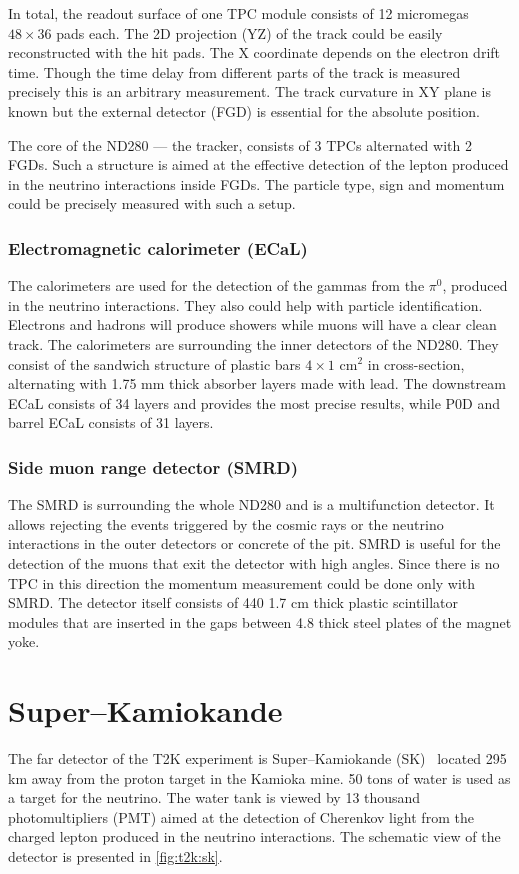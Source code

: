 \documentclass[../main.tex]{subfiles}
\begin{document}
In total, the readout surface of one TPC module consists of 12 micromegas $48\times36$ pads each. The 2D projection (YZ) of the track could be easily reconstructed with the hit pads. The X coordinate depends on the electron drift time. Though the time delay from different parts of the track is measured precisely this is an arbitrary measurement. The track curvature in XY plane is known but the external detector (FGD) is essential for the absolute position.

The core of the ND280 --- the tracker, consists of 3 TPCs alternated with 2 FGDs. Such a structure is aimed at the effective detection of the lepton produced in the neutrino interactions inside FGDs. The particle type, sign and momentum could be precisely measured with such a setup.

\subsubsection{Electromagnetic calorimeter (ECaL)}
The calorimeters are used for the detection of the gammas from the $\pi^0$, produced in the neutrino interactions. They also could help with particle identification. Electrons and hadrons will produce showers while muons will have a clear clean track. The calorimeters are surrounding the inner detectors of the ND280. They consist of the sandwich structure of plastic bars $4\times1$ $\text{cm}^2$ in cross-section, alternating with 1.75 mm thick absorber layers made with lead. The downstream ECaL consists of 34 layers and provides the most precise results, while P0D and barrel ECaL consists of 31 layers.

\subsubsection{Side muon range detector (SMRD)}
The SMRD is surrounding the whole ND280 and is a multifunction detector. It allows rejecting the events triggered by the cosmic rays or the neutrino interactions in the outer detectors or concrete of the pit. SMRD is useful for the detection of the muons that exit the detector with high angles. Since there is no TPC in this direction the momentum measurement could be done only with SMRD. The detector itself consists of 440 1.7 cm thick plastic scintillator modules that are inserted in the gaps between 4.8 thick steel plates of the magnet yoke.


\section{Super--Kamiokande}
\label{sec:T2K:sk}
The far detector of the T2K experiment is Super--Kamiokande (SK)~\cite{Fukuda2003} located 295 km away from the proton target in the Kamioka mine. 50 tons of water is used as a target for the neutrino. The water tank is viewed by 13 thousand photomultipliers (PMT) aimed at the detection of Cherenkov light from the charged lepton produced in the neutrino interactions. The schematic view of the detector is presented in \autoref{fig:t2k:sk}.
\end{document}
